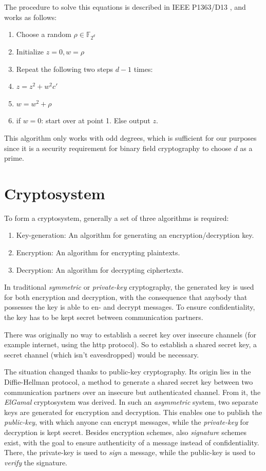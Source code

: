 \documentclass[11pt,english]{article}
\begin{document}
The procedure to solve this equations is described in IEEE P1363/D13 \cite{point-decompress}, and works as follows:
\begin{enumerate}
 \item Choose a random $\rho\in\mathbb{F}_{2^d}$
 \item Initialize $z=0,w=\rho$
 \item Repeat the following two steps $d-1$ times:
 \item $z=z^2+w^2c'$
 \item $w=w^2+\rho$
 \item if $w=0$: start over at point 1. Else output $z$.
\end{enumerate}

This algorithm only works with odd degrees, which is sufficient for our purposes since it is a security requirement for binary field cryptography to choose $d$ as a prime.

\section{Cryptosystem}
To form a cryptosystem, generally a set of three algorithms is required:
\begin{enumerate}
 \item Key-generation: An algorithm for generating an encryption/decryption key.
 \item Encryption: An algorithm for encrypting plaintexts.
 \item Decryption: An algorithm for decrypting ciphertexts.
\end{enumerate}
In traditional \emph{symmetric} or \emph{private-key} cryptography, the generated key is used for both encryption and decryption, with the consequence that anybody that possesses the key is able to en- and decrypt messages. To ensure confidentiality, the key has to be kept secret between communication partners.

There was originally no way to establish a secret key over insecure channels (for example internet, using the http protocol). So to establish a shared secret key, a secret channel (which isn't eavesdropped) would be necessary.

The situation changed thanks to public-key cryptography. Its origin lies in the Diffie-Hellman \cite{Diffie76newdirections} protocol, a method to generate a shared secret key between two communication partners over an insecure but authenticated channel. From it, the \emph{ElGamal} cryptosystem \cite{19480} was derived. In such an \emph{asymmetric} system, two separate keys are generated for encryption and decryption. This enables one to publish the \emph{public-key}, with which anyone can encrypt messages, while the \emph{private-key} for decryption is kept secret. Besides encryption schemes, also \emph{signature} schemes exist, with the goal to ensure authenticity of a message instead of confidentiality. There, the private-key is used to \emph{sign} a message, while the public-key is used to \emph{verify} the signature.
\end{document}

